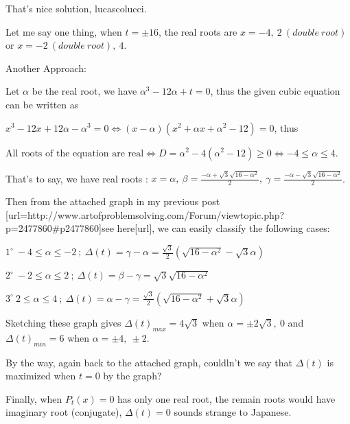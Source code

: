 \begin{solution}
	That's nice solution, lucascolucci.

Let me say one thing, when $t=\pm 16$, the real roots are $x=-4, \ 2\ (double\ root)$ or $x=-2\ (double\ root),\ 4$.

Another Approach:

Let $\alpha $ be the real root, we have $\alpha ^3-12\alpha +t=0$, thus the given cubic equation can be written as 

$x^3-12x+12\alpha -\alpha ^ 3=0\Longleftrightarrow (x-\alpha)(x^2+\alpha x+\alpha ^ 2 -12)=0$, thus 

$\text{All roots of the equation are real}\Longleftrightarrow D=\alpha ^ 2-4(\alpha ^2-12)\geq 0\Longleftrightarrow -4\leq \alpha \leq 4$.

That's to say, we have real roots : $x=\alpha,\ \beta=\frac{-\alpha +\sqrt{3}\sqrt{16-\alpha ^ 2}}{2},\ \gamma=\frac{-\alpha -\sqrt{3}\sqrt{16-\alpha ^ 2}}{2}$.

Then from the attached graph in my previous post [url=http://www.artofproblemsolving.com/Forum/viewtopic.php?p=2477860#p2477860]see here[\/url], we can easily classify the following cases:

$1^\circ\ -4\leq \alpha\leq -2\ ;\ \Delta(t)=\gamma -\alpha=\frac{\sqrt{3}}{2}(\sqrt{16-\alpha ^ 2}-\sqrt{3}\alpha)$

$2^\circ\ -2\leq \alpha \leq 2\ ;\ \Delta(t)=\beta-\gamma =\sqrt{3}\sqrt{16-\alpha ^ 2}$

$3^\circ\ 2\leq \alpha \leq 4\ ;\ \Delta(t)=\alpha -\gamma =\frac{\sqrt{3}}{2}(\sqrt{16-\alpha ^ 2}+\sqrt{3}\alpha)$

Sketching these graph gives $\Delta (t)_{max}=4\sqrt{3}$ when $\alpha =\pm 2\sqrt{3},\ 0$ and $\Delta (t)_{min}=6$ when $\alpha =\pm 4,\ \pm 2$.

By the way, again back to the attached graph, couldln't we say that $\Delta(t)$ is maximized when $t=0$ by the graph?

Finally, when $P_t(x)=0$ has only one real root, the remain roots would have imaginary root (conjugate), $\Delta (t)=0$ sounds strange to Japanese.
\end{solution}




